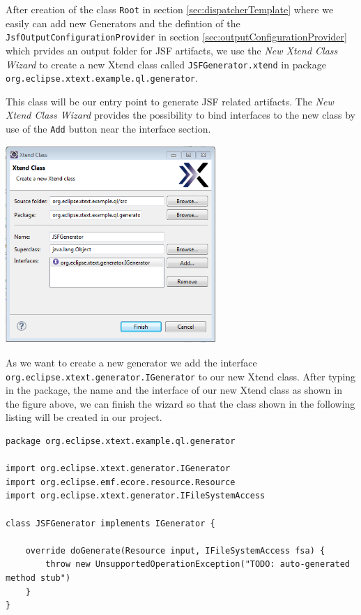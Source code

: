 After creation of the class \texttt{Root} in section
\ref{sec:dispatcherTemplate} where we easily can
add new Generators and the defintion of the
\texttt{JsfOutputConfigurationProvider} in section \ref{sec:outputConfigurationProvider}
which prvides an output folder for JSF
artifacts, we use the \emph{New Xtend Class Wizard} to create a new Xtend class
called \texttt{JSFGenerator.xtend} in package \texttt{org.eclipse.xtext.example.ql.generator}.

This class will be our entry point to generate JSF related artifacts. The
\emph{New Xtend Class Wizard} provides the possibility to bind interfaces to the
new class by use of the \texttt{Add} button near the interface section.

\begin{center}
\includegraphics[width=8cm]{./images/chapter02/newXtendClassWizard.png}
\end{center}

As we want to create a new generator we add the interface
\texttt{org.eclipse.xtext.generator.IGenerator} to our new Xtend class.
After typing in the package, the name and the interface of our new Xtend class
as shown in the figure above, we can finish the
wizard so that the class shown in the following listing
will be created in our project.

\begin{lstlisting}[language=Xtend] 
package org.eclipse.xtext.example.ql.generator

import org.eclipse.xtext.generator.IGenerator
import org.eclipse.emf.ecore.resource.Resource
import org.eclipse.xtext.generator.IFileSystemAccess

class JSFGenerator implements IGenerator {
	
	override doGenerate(Resource input, IFileSystemAccess fsa) {
		throw new UnsupportedOperationException("TODO: auto-generated method stub")
	}
}
\end{lstlisting}

